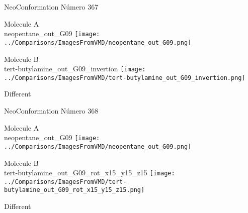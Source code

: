 \newpage

\vtab[-3cm]
\begin{center}
{\large NeoConformation \tab Número 367}
\end{center}
\begin{multicols}{2}
\begin{center}
Molecule A \\ 
neopentane\_out\_G09
\texttt{[image: ../Comparisons/ImagesFromVMD/neopentane\_out\_G09.png]}
\\
\vtab

\columnbreak
Molecule B \\ 
tert-butylamine\_out\_G09\_invertion
\texttt{[image: ../Comparisons/ImagesFromVMD/tert-butylamine\_out\_G09\_invertion.png]}
\\
\vtab


\end{center}
\end{multicols}
\begin{center}
\textcolor{NavyBlue}{\Large Different}
\end{center}

 \newpage

\vtab[-3cm]
\begin{center}
{\large NeoConformation \tab Número 368}
\end{center}
\begin{multicols}{2}
\begin{center}
Molecule A \\ 
neopentane\_out\_G09
\texttt{[image: ../Comparisons/ImagesFromVMD/neopentane\_out\_G09.png]}
\\
\vtab

\columnbreak
Molecule B \\ 
tert-butylamine\_out\_G09\_rot\_x15\_y15\_z15
\texttt{[image: ../Comparisons/ImagesFromVMD/tert-butylamine\_out\_G09\_rot\_x15\_y15\_z15.png]}
\\
\vtab


\end{center}
\end{multicols}
\begin{center}
\textcolor{NavyBlue}{\Large Different}
\end{center}

 \newpage

